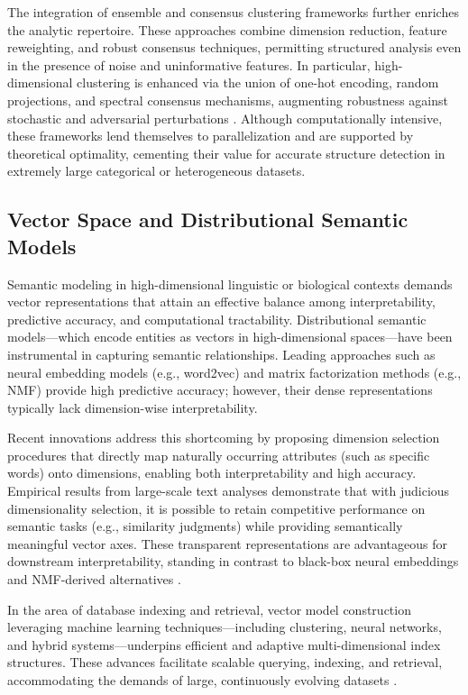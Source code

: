 \documentclass[sigconf]{acmart}
\begin{document}
The integration of ensemble and consensus clustering frameworks further enriches the analytic repertoire. These approaches combine dimension reduction, feature reweighting, and robust consensus techniques, permitting structured analysis even in the presence of noise and uninformative features. In particular, high-dimensional clustering is enhanced via the union of one-hot encoding, random projections, and spectral consensus mechanisms, augmenting robustness against stochastic and adversarial perturbations \cite{ref92,ref95}. Although computationally intensive, these frameworks lend themselves to parallelization and are supported by theoretical optimality, cementing their value for accurate structure detection in extremely large categorical or heterogeneous datasets.

\subsection{Vector Space and Distributional Semantic Models}

Semantic modeling in high-dimensional linguistic or biological contexts demands vector representations that attain an effective balance among interpretability, predictive accuracy, and computational tractability. Distributional semantic models—which encode entities as vectors in high-dimensional spaces—have been instrumental in capturing semantic relationships. Leading approaches such as neural embedding models (e.g., word2vec) and matrix factorization methods (e.g., NMF) provide high predictive accuracy; however, their dense representations typically lack dimension-wise interpretability.

Recent innovations address this shortcoming by proposing dimension selection procedures that directly map naturally occurring attributes (such as specific words) onto dimensions, enabling both interpretability and high accuracy. Empirical results from large-scale text analyses demonstrate that with judicious dimensionality selection, it is possible to retain competitive performance on semantic tasks (e.g., similarity judgments) while providing semantically meaningful vector axes. These transparent representations are advantageous for downstream interpretability, standing in contrast to black-box neural embeddings and NMF-derived alternatives \cite{ref115}.

In the area of database indexing and retrieval, vector model construction leveraging machine learning techniques—including clustering, neural networks, and hybrid systems—underpins efficient and adaptive multi-dimensional index structures. These advances facilitate scalable querying, indexing, and retrieval, accommodating the demands of large, continuously evolving datasets \cite{ref113}.
\end{document}
